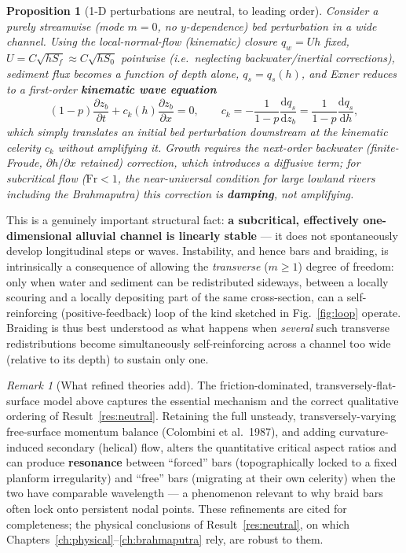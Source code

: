 \documentclass[11pt,a4paper]{report}
\theoremstyle{definition}
\theoremstyle{plain}
\newtheorem{proposition}{Proposition}[chapter]
\theoremstyle{remark}
\newtheorem{remark}{Remark}[chapter]
\newcommand{\dd}{\mathrm{d}}
\newcommand{\pdv}[2]{\dfrac{\partial #1}{\partial #2}}
\newcommand{\Fr}{\mathrm{Fr}}
\begin{document}
\begin{proposition}[1-D perturbations are neutral, to leading order]
Consider a purely streamwise (mode $m=0$, no $y$-dependence) bed perturbation in a wide channel. Using the local-normal-flow (kinematic) closure $q_w=Uh$ fixed, $U=C\sqrt{hS_f}\approx C\sqrt{hS_0}$ pointwise (i.e.\ neglecting backwater/inertial corrections), sediment flux becomes a function of depth alone, $q_s=q_s(h)$, and Exner reduces to a first-order \textbf{kinematic wave equation}
\begin{equation}
(1-p)\pdv{z_b}{t} + c_k(h)\pdv{z_b}{x} = 0, \qquad c_k = -\frac{1}{1-p}\frac{\dd q_s}{\dd z_b} = \frac{1}{1-p}\frac{\dd q_s}{\dd h},
\label{eq:kinwave}
\end{equation}
which simply \emph{translates} an initial bed perturbation downstream at the kinematic celerity $c_k$ \emph{without amplifying it}. Growth requires the next-order backwater (finite-Froude, $\partial h/\partial x$ retained) correction, which introduces a diffusive term; for subcritical flow ($\Fr<1$, the near-universal condition for large lowland rivers including the Brahmaputra) this correction is \textbf{damping}, not amplifying.
\end{proposition}
This is a genuinely important structural fact: \textbf{a subcritical, effectively one-dimensional alluvial channel is linearly stable} --- it does not spontaneously develop longitudinal steps or waves. Instability, and hence bars and braiding, is intrinsically a consequence of allowing the \emph{transverse} ($m\ge1$) degree of freedom: only when water and sediment can be redistributed sideways, between a locally scouring and a locally depositing part of the same cross-section, can a self-reinforcing (positive-feedback) loop of the kind sketched in Fig.~\ref{fig:loop} operate. Braiding is thus best understood as what happens when \emph{several} such transverse redistributions become simultaneously self-reinforcing across a channel too wide (relative to its depth) to sustain only one.

\begin{remark}[What refined theories add]
The friction-dominated, transversely-flat-surface model above captures the essential mechanism and the correct qualitative ordering of Result~\ref{res:neutral}. Retaining the full unsteady, transversely-varying free-surface momentum balance (Colombini et al.\ 1987), and adding curvature-induced secondary (helical) flow, alters the quantitative critical aspect ratios and can produce \textbf{resonance} between ``forced'' bars (topographically locked to a fixed planform irregularity) and ``free'' bars (migrating at their own celerity) when the two have comparable wavelength — a phenomenon relevant to why braid bars often lock onto persistent nodal points. These refinements are cited for completeness; the physical conclusions of Result~\ref{res:neutral}, on which Chapters~\ref{ch:physical}--\ref{ch:brahmaputra} rely, are robust to them.
\end{remark}
\end{document}
